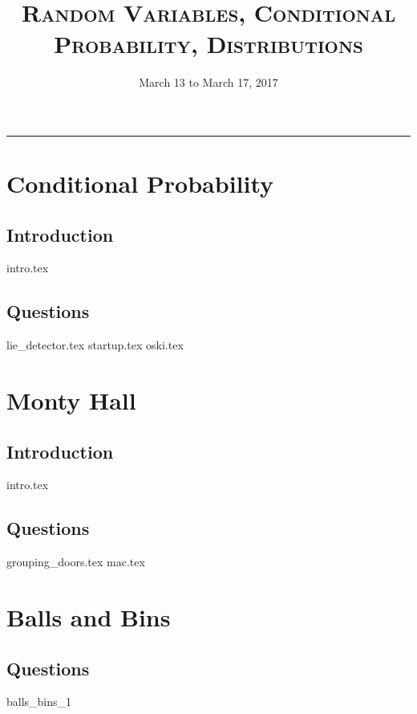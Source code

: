 \documentclass{exam}
\title{\textsc{Random Variables, Conditional Probability, Distributions}}
\date{March 13 to March 17, 2017}
\begin{document}
\maketitle
\rule{\textwidth}{0.15em}
\fontsize{12}{15}\selectfont
\thispagestyle{empty}

\section{Conditional Probability}
\subsection{Introduction}
{intro.tex}
\subsection{Questions}
\begin{questions}
{lie_detector.tex}
{startup.tex}
{oski.tex}
\end{questions}

\section{Monty Hall}
\subsection{Introduction}
{intro.tex}
\subsection{Questions}
\begin{questions}
{grouping_doors.tex}
{mac.tex}
\end{questions}

\section{Balls and Bins}
\begin{questions}
\subsection{Questions}
{balls_bins_1}
\end{questions}
\end{document}
